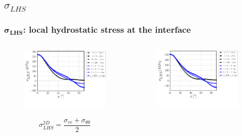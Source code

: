 \documentclass[first,firstsupp,lastsupp,last,hyperref,table]{ETHclass}
\begin{document}
\subsection{$\sigma_{LHS}$}

\begin{frame}
\frametitle{\vspace{0.2cm}\small $\mathbf{\sigma_{LHS}}$: local hydrostatic stress at the interface}
\vspace{-.75cm}
\centering
\begin{columns}[c]
\centering
\begin{column}{0.5\textwidth}
\centering
\begin{figure}
\centering
\includegraphics[width=\columnwidth]{vf60-nodamage-p2D-notol.pdf}
\end{figure}
\vspace{-0.5cm}
\scriptsize
\begin{equation*}
\sigma^{2D}_{LHS}=\frac{\sigma_{rr}+\sigma_{\theta\theta}}{2}
\end{equation*}
\end{column}
\begin{column}{0.5\textwidth}
\centering
\begin{figure}
\centering
\includegraphics[width=\columnwidth]{vf60-nodamage-p3D-notol.pdf}

\end{figure}
\end{column}
\end{columns}
\end{frame}
\end{document}
